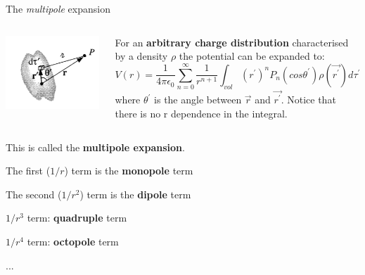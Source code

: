 %
%
%

\begin{frame}{The {\em multipole} expansion}

\begin{columns}
  \begin{column}{0.30\textwidth}
   \begin{center}
     \includegraphics[width=0.99\textwidth]{./images/schematics/continuous_charge_distribution_1.png}\\
   \end{center}
  \end{column}
  \begin{column}{0.70\textwidth}
    For an {\bf arbitrary charge distribution} characterised by a density $\rho$
    the potential can be expanded to:
    \begin{equation*}
      V(r) = \frac{1}{4\pi\epsilon_0} \sum_{n=0}^{\infty} \frac{1}{r^{n+1}}
        \int_{vol} (r^{\prime})^{n} P_{n}(cos\theta^{\prime}) \rho(\vec{r^{\prime}}) d{\tau}^{\prime}
    \end{equation*}
    where $\theta^{\prime}$ is the angle between $\vec{r}$ and $\vec{r^{\prime}}$.
    Notice that there is no r dependence in the integral.\\
  \end{column}
\end{columns}

\vspace{0.3cm}

This is called the {\bf multipole expansion}.
\begin{itemize}
{\small
  \item The first ($1/r$) term is the {\bf monopole} term
  \item The second ($1/r^2$) term is the {\bf dipole} term
  \item $1/r^3$ term: {\bf quadruple} term
  \item $1/r^4$ term: {\bf octopole} term
  \item ...
}
\end{itemize}

\end{frame}
